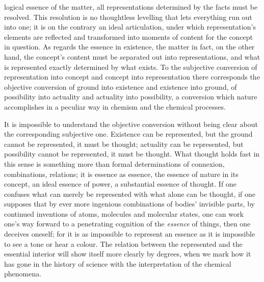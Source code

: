 \documentclass[12pt,a4paper]{book}
\begin{document}
logical essence of the matter, all representations determined by the facts must be resolved. This resolution is no
thoughtless levelling that lets everything run out into one; it is on the contrary an ideal articulation, under which
representation's elements are reflected and transformed into moments of content for the concept in question. As regards
the essence in existence, the matter in fact, on the other hand, the concept's content must be separated out into
representations, and what is represented exactly determined by what exists. To the subjective conversion of
representation into concept and concept into representation there corresponds the objective conversion of ground into
existence and existence into ground, of possibility into actuality and actuality into possibility, a conversion which
nature accomplishes in a peculiar way in chemism and the chemical processes.

It is impossible to understand the objective conversion without being clear about the corresponding subjective one.
Existence can be represented, but the ground cannot be represented, it must be thought; actuality can be represented, but
possibility cannot be represented, it must be thought. What thought holds fast in this sense is something more than
formal determinations of connexion, combinations, relations; it is essence as essence, the essence of nature in its
concept, an ideal essence of power, a substantial essence of thought. If one confuses what can merely be represented with
what alone can be thought, if one supposes that by ever more ingenious combinations of bodies' invisible parts, by
continued inventions of atoms, molecules and molecular states, one can work one's way forward to a penetrating cognition
of the \emph{essence} of things, then one deceives oneself; for it is as impossible to represent an essence as it is
impossible to see a tone or hear a colour.
The relation between the represented and the essential interior will show itself more clearly by degrees, when we mark
how it has gone in the history of science with the interpretation of the chemical phenomena.
\end{document}
